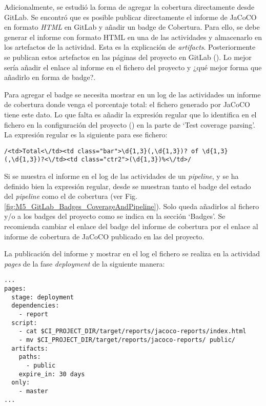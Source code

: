Adicionalmente, se estudió la forma de agregar la cobertura directamente desde GitLab. Se encontró que es posible publicar directamente el informe de JaCoCO en formato \textit{HTML} en GitLab y añadir un badge de Cobertura. Para ello, se debe generar el informe con formato HTML en una de las actividades y almacenarlo en los artefactos de la actividad. Esta es la explicación de \textit{artifacts}. Posteriormente se publican estos artefactos en las páginas del proyecto en GitLab (). Lo mejor sería añadir el enlace al informe en el fichero  del proyecto y ¿qué mejor forma que añadirlo en forma de badge?. 

Para agregar el badge se necesita mostrar en un log de las actividades un informe de cobertura donde venga el porcentaje total: el fichero  generado por JaCoCO tiene este dato. Lo que falta es añadir la expresión regular que lo identifica en el fichero en la configuración del proyecto () en la parte de `Test coverage parsing'. La expresión regular es la siguiente para ese fichero:\\
\begin{minipage}{\linewidth}
{\tiny
\begin{lstlisting}[breaklines]
/<td>Total<\/td><td class="bar">\d{1,3}(,\d{1,3})? of \d{1,3}(,\d{1,3})?<\/td><td class="ctr2">(\d{1,3})%<\/td>/
\end{lstlisting}
}
\end{minipage}
Si se muestra el informe en el log de las actividades de un \textit{pipeline}, y se ha definido bien la expresión regular, desde  se muestran tanto el badge del estado del \textit{pipeline} como el de cobertura (ver Fig. \ref{fig:M5_GitLab_Badges_CoverageAndPipeline}). Solo queda añadirlos al fichero  y/o a los badges del proyecto como se indica en la sección `Badges'. Se recomienda cambiar el enlace del badge del informe de cobertura por el enlace al informe de cobertura de JaCoCO publicado en las  del proyecto.


La publicación del informe y mostrar en el log el fichero  se realiza en la actividad \textit{pages} de la fase \textit{deployment} de la siguiente manera:\\
\begin{minipage}{\linewidth}
{\tiny
\begin{lstlisting}[breaklines]
...
pages:
  stage: deployment
  dependencies: 
	- report
  script:
	- cat $CI_PROJECT_DIR/target/reports/jacoco-reports/index.html
	- mv $CI_PROJECT_DIR/target/reports/jacoco-reports/ public/
  artifacts:
	paths:
	  - public
	expire_in: 30 days    
  only:
	- master
...
\end{lstlisting}
}
\end{minipage}

